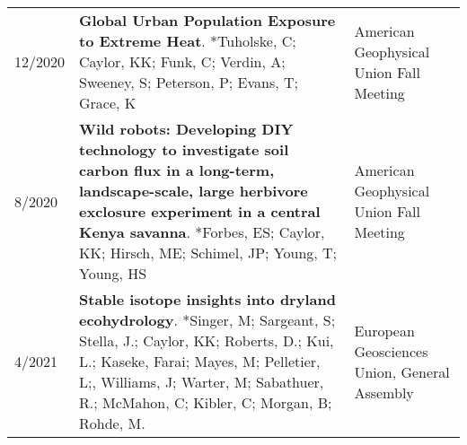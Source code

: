 \begin{longtable}{lp{10.0cm}p{4.5cm}}
12/2020 & {\bf Global Urban Population Exposure to Extreme Heat}. *Tuholske, C; Caylor, KK; Funk, C; Verdin, A; Sweeney, S; Peterson, P; Evans, T; Grace, K  & American Geophysical Union Fall Meeting \\
  
8/2020 & {\bf Wild robots: Developing DIY technology to investigate soil carbon flux in a long-term, landscape-scale, large herbivore exclosure experiment in a central Kenya savanna}. *Forbes, ES; Caylor, KK; Hirsch, ME; Schimel, JP; Young, T; Young, HS  & American Geophysical Union Fall Meeting \\
  
4/2021 & {\bf Stable isotope insights into dryland ecohydrology}. *Singer, M; Sargeant, S; Stella, J.; Caylor, KK; Roberts, D.; Kui, L.; Kaseke, Farai; Mayes, M; Pelletier, L;, Williams, J; Warter, M; Sabathuer, R.; McMahon, C; Kibler, C; Morgan, B; Rohde, M.   & European Geosciences Union, General Assembly 
 \\
 \end{longtable}

